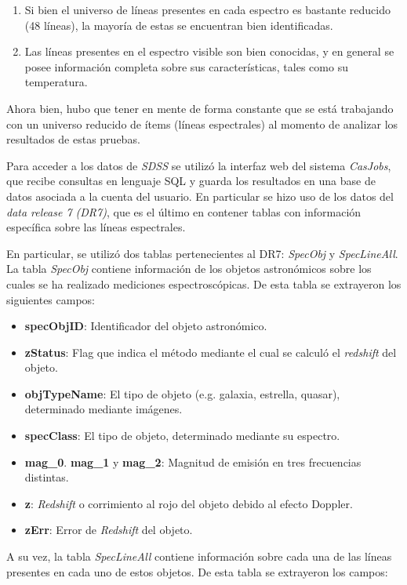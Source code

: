 \begin{enumerate}
\item Si bien el universo de líneas presentes en cada espectro es bastante reducido (48 líneas), la mayoría de estas se encuentran bien identificadas.
\item Las líneas presentes en el espectro visible son bien conocidas, y en general se posee información completa sobre sus características, tales como su temperatura.
\end{enumerate}

Ahora bien, hubo que tener en mente de forma constante que se está trabajando con un universo reducido de ítems (líneas espectrales) al momento de analizar los resultados de estas pruebas.

Para acceder a los datos de \textit{SDSS} se utilizó la interfaz web del sistema \textit{CasJobs}, que recibe consultas en lenguaje SQL y guarda los resultados en una base de datos asociada a la cuenta del usuario. En particular se hizo uso de los datos del \textit{data release 7 (DR7)}, que es el último en contener tablas con información específica sobre las líneas espectrales.

En particular, se utilizó dos tablas pertenecientes al DR7: \textit{SpecObj} y \textit{SpecLineAll}. La tabla \textit{SpecObj} contiene información de los objetos astronómicos sobre los cuales se ha realizado mediciones espectroscópicas. De esta tabla se extrayeron los siguientes campos:

\begin{itemize}
\item \textbf{specObjID}: Identificador del objeto astronómico.
\item \textbf{zStatus}: Flag que indica el método mediante el cual se calculó el \textit{redshift} del objeto.
\item \textbf{objTypeName}: El tipo de objeto (e.g. galaxia, estrella, quasar), determinado mediante imágenes.
\item \textbf{specClass}: El tipo de objeto, determinado mediante su espectro.
\item \textbf{mag\_0}. \textbf{mag\_1} y \textbf{mag\_2}: Magnitud de emisión en tres frecuencias distintas.
\item \textbf{z}: \textit{Redshift} o corrimiento al rojo del objeto debido al efecto Doppler.
\item \textbf{zErr}: Error de \textit{Redshift} del objeto.
\end{itemize}

A su vez, la tabla \textit{SpecLineAll} contiene información sobre cada una de las líneas presentes en cada uno de estos objetos. De esta tabla se extrayeron los campos:

